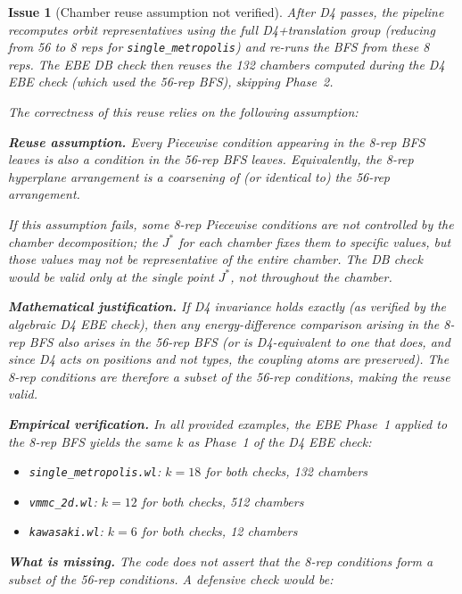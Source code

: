 \documentclass[12pt,a4paper]{article}
\theoremstyle{critical}
\newtheorem{issue}{Issue}
\theoremstyle{remark}
\theoremstyle{verified}
\begin{document}
\begin{issue}[Chamber reuse assumption not verified]
\label{issue:chambers}
After D4 passes, the pipeline recomputes orbit representatives using the full
D4+translation group (reducing from 56 to 8 reps for \texttt{single\_metropolis})
and re-runs the BFS from these 8 reps.  The EBE DB check then reuses the 132
chambers computed during the D4 EBE check (which used the 56-rep BFS), skipping
Phase~2.

The correctness of this reuse relies on the following assumption:

\begin{mdframed}[backgroundcolor=yellow!20,linewidth=0.5pt]
\textbf{Reuse assumption.}  Every Piecewise condition appearing in the 8-rep BFS
leaves is also a condition in the 56-rep BFS leaves.  Equivalently, the 8-rep
hyperplane arrangement is a \emph{coarsening} of (or identical to) the 56-rep
arrangement.
\end{mdframed}

If this assumption fails, some 8-rep Piecewise conditions are not controlled by
the chamber decomposition; the $J^\ast$ for each chamber fixes them to specific
values, but those values may not be representative of the entire chamber.  The DB
check would be valid only at the single point $J^\ast$, not throughout the
chamber.

\textbf{Mathematical justification.}
If D4 invariance holds exactly (as verified by the algebraic D4 EBE check), then
any energy-difference comparison arising in the 8-rep BFS also arises in the
56-rep BFS (or is D4-equivalent to one that does, and since D4 acts on positions
and not types, the coupling atoms are preserved).  The 8-rep conditions are
therefore a subset of the 56-rep conditions, making the reuse valid.

\textbf{Empirical verification.}
In all provided examples, the EBE Phase~1 applied to the 8-rep BFS yields the
same $k$ as Phase~1 of the D4 EBE check:
\begin{itemize}
\item \texttt{single\_metropolis.wl}: $k = 18$ for both checks, 132 chambers
\item \texttt{vmmc\_2d.wl}: $k = 12$ for both checks, 512 chambers
\item \texttt{kawasaki.wl}: $k = 6$ for both checks, 12 chambers
\end{itemize}

\textbf{What is missing.}
The code does not assert that the 8-rep conditions form a subset of the 56-rep
conditions.  A defensive check would be:


\end{issue}
\end{document}
